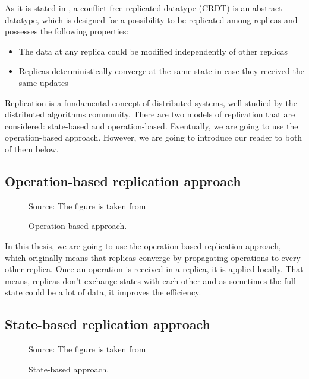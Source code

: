 As it is stated in \citet{3}, a conflict-free replicated datatype (CRDT) is an abstract datatype, which is designed for a possibility to be replicated among replicas and possesses the following properties:


    \begin{itemize}
        \item {The data at any replica could be modified independently of other replicas}
        \item {Replicas deterministically converge at the same state in case they received the same updates}
    \end{itemize}

Replication is a fundamental concept of distributed systems, well studied by the distributed algorithms community\cite{2}. There are two models of replication that are considered: state-based and operation-based. Eventually, we are going to use the operation-based approach. However, we are going to introduce our reader to both of them below. 

\subsection*{Operation-based replication approach}

\begin{figure}[!htb]
    \begin{center}
    \def\svgwidth{\linewidth}
    
      {\scriptsize%
     Source: The figure is taken from \cite{2}}
    \caption {Operation-based approach.}
    \label{fig:theory1}
\end{center}
\end{figure}



In this thesis, we are going to use the operation-based replication approach, which originally means that replicas converge by propagating operations to every other replica\cite{3}. Once an operation is received in a replica, it is applied locally. That means, replicas don't exchange states with each other and as sometimes the full state could be a lot of data, it improves the efficiency. 

\subsection*{State-based replication approach}

\begin{figure}[!htb]
    \begin{center}
    \def\svgwidth{\linewidth}
    
      {\scriptsize%
     Source: The figure is taken from \cite{2}}
    \caption {State-based approach.}
    \label{fig:theory2}
\end{center}
\end{figure}

